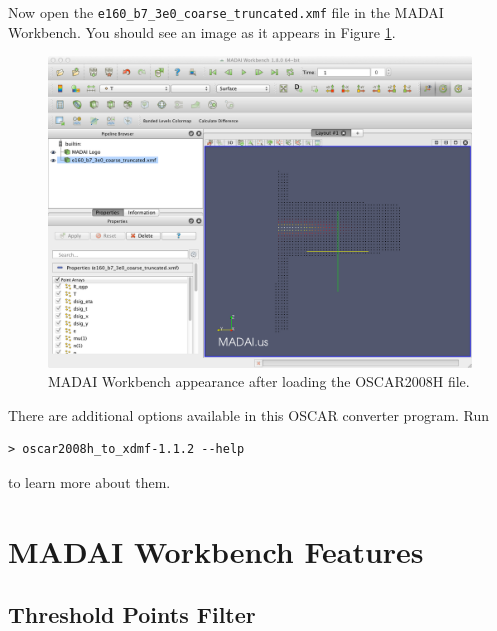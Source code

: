 \documentclass[12pt]{article}
\begin{document}
Now open the \texttt{e160\_b7\_3e0\_coarse\_truncated.xmf} file in the MADAI Workbench. You should see an image as it appears in Figure \ref{fig:OSCAR2008H_ScreenShot}.


\begin{figure}[htbp]
   \centering
   \includegraphics[scale=.35]{images/OSCAR2008H_ScreenShot.png} %
   \caption{MADAI Workbench appearance after loading the OSCAR2008H file.}
   \label{fig:OSCAR2008H_ScreenShot}
\end{figure}

There are additional options available in this OSCAR converter program. Run

\begin{verbatim}
> oscar2008h_to_xdmf-1.1.2 --help
\end{verbatim}
to learn more about them.

\section{MADAI Workbench Features}

\subsection{Threshold Points Filter}
\end{document}
